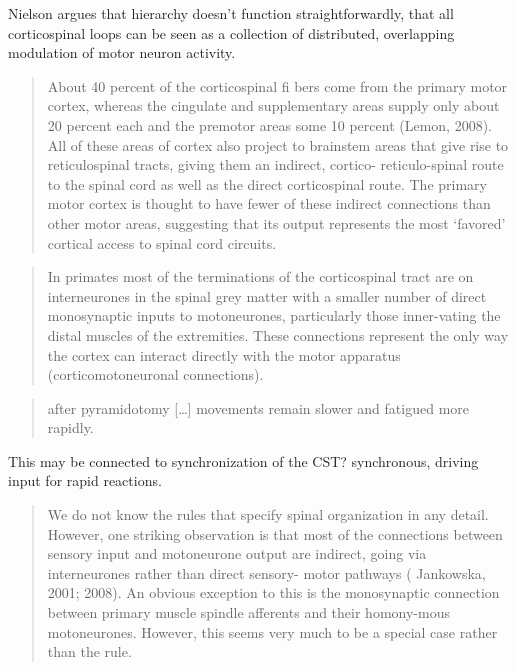 \documentclass[../main.tex]{subfiles}
\begin{document}
{{{Nielson argues that hierarchy doesn't function straightforwardly, that
all corticospinal loops can be seen as a collection of distributed,
overlapping modulation of motor neuron activity.

\begin{quote}
About 40 percent of the corticospinal fi bers come from the primary
motor cortex, whereas the cingulate and supplementary areas supply only
about 20 percent each and the premotor areas some 10 percent (Lemon,
2008). All of these areas of cortex also project to brainstem areas that
give rise to reticulospinal tracts, giving them an indirect, cortico-
reticulo-spinal route to the spinal cord as well as the direct
corticospinal route. The primary motor cortex is thought to have fewer
of these indirect connections than other motor areas, suggesting that
its output represents the most `favored' cortical access to spinal cord
circuits.
\end{quote}

\begin{quote}
In primates most of the terminations of the corticospinal tract are on
interneurones in the spinal grey matter with a smaller number of direct
monosynaptic inputs to motoneurones, particularly those inner-vating the
distal muscles of the extremities. These connections represent the only
way the cortex can interact directly with the motor apparatus
(corticomotoneuronal connections).
\end{quote}

\begin{quote}
after pyramidotomy {[}\ldots{]} movements remain slower and fatigued
more rapidly.
\end{quote}

This may be connected to synchronization of the CST? synchronous,
driving input for rapid reactions.

\begin{quote}
We do not know the rules that specify spinal organization in any detail.
However, one striking observation is that most of the connections
between sensory input and motoneurone output are indirect, going via
interneurones rather than direct sensory- motor pathways ( Jankowska,
2001; 2008). An obvious exception to this is the monosynaptic connection
between primary muscle spindle afferents and their homony-mous
motoneurones. However, this seems very much to be a special case rather
than the rule.
\end{quote}

}}}
\end{document}
